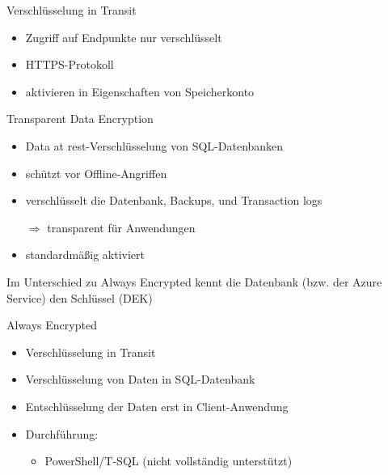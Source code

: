 \begin{flashcard}[Definition]{Verschlüsselung in Transit}
    \begin{itemize}
        \item Zugriff auf Endpunkte nur verschlüsselt
        \item HTTPS-Protokoll
        \item aktivieren in Eigenschaften von Speicherkonto
    \end{itemize}
\end{flashcard}

\begin{flashcard}[Definition]{Transparent Data Encryption}
    \begin{itemize}
        \item Data at rest-Verschlüsselung von SQL-Datenbanken
        \item schützt vor Offline-Angriffen
        \item verschlüsselt die Datenbank, Backups, und Transaction logs
        \item[$\Rightarrow$] transparent für Anwendungen
        \item standardmäßig aktiviert
    \end{itemize}
    \vspace{1cm}
    Im Unterschied zu Always Encrypted kennt die Datenbank (bzw. der Azure Service) den Schlüssel (DEK)
\end{flashcard}


\begin{flashcard}[Definition]{Always Encrypted}
    \begin{itemize}
        \item Verschlüsselung in Transit
        \item Verschlüsselung von Daten in SQL-Datenbank
        \item Entschlüsselung der Daten erst in Client-Anwendung
        \item Durchführung:
            \begin{itemize}
             \item PowerShell/T-SQL (nicht vollständig unterstützt)
            \end{itemize}
    \end{itemize}
\end{flashcard}

